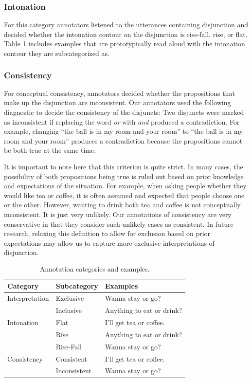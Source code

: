 \documentclass[10pt, letterpaper]{article}
\begin{document}
\subsubsection{Intonation}\label{intonation}

For this category annotators listened to the utterances containing
disjunction and decided whether the intonation contour on the
disjunction is rise-fall, rise, or flat. Table 1 includes examples that
are prototypically read aloud with the intonation contour they are
subcategorized as.

\subsubsection{Consistency}\label{consistency}

For conceptual consistency, annotators decided whether the propositions
that make up the disjunction are inconsistent. Our annotators used the
following diagnostic to decide the consistency of the disjuncts: Two
disjuncts were marked as inconsistent if replacing the word \emph{or}
with \emph{and} produced a contradiction. For example, changing ``the
ball is in my room and your room'' to ``the ball is in my room and your
room'' produces a contradiction because the propositions cannot be both
true at the same time.

It is important to note here that this criterion is quite strict. In
many cases, the possibility of both propositions being true is ruled out
based on prior knowledge and expectations of the situation. For example,
when asking people whether they would like tea or coffee, it is often
assumed and expected that people choose one or the other. However,
wanting to drink both tea and coffee is not conceptually inconsistent.
It is just very unlikely. Our annotations of consistency are very
conservative in that they consider such unlikely cases as consistent. In
future research, relaxing this definition to allow for exclusion based
on prior expectations may allow us to capture more exclusive
interpretations of disjunction.

\begin{table}[b]
\centering
\begin{tabular}{lll}
 Category & Subcategory & Examples \\ 
  \hline
Interpretation & Exclusive & Wanna stay or go? \\ 
   & Inclusive & Anything to eat or drink? \\ 
   \hline
Intonation & Flat & I'll get tea or coffee. \\ 
   & Rise & Anything to eat or drink? \\ 
   & Rise-Fall & Wanna stay or go? \\ 
   \hline
Consistency & Consistent & I'll get tea or coffee. \\ 
   & Inconsistent & Wanna stay or go? \\ 
  \end{tabular}
\caption{Annotation categories and examples.} 
\end{table}
\end{document}
